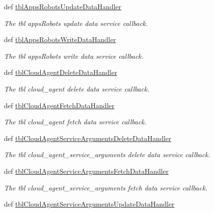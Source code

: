 \begin{DoxyCompactItemize}
def \hyperlink{classmysql__wrapper__old_1_1MySQLdbWrapper_a5158e06cd8ef056414394a8388f18d44}{tbl\-Apps\-Robots\-Update\-Data\-Handler}
\begin{DoxyCompactList}\small\item\em The tbl apps\-Robots update data service callback. \end{DoxyCompactList}\item 
def \hyperlink{classmysql__wrapper__old_1_1MySQLdbWrapper_ad88a32d718a11df3f800c5d8b904ca93}{tbl\-Apps\-Robots\-Write\-Data\-Handler}
\begin{DoxyCompactList}\small\item\em The tbl apps\-Robots write data service callback. \end{DoxyCompactList}\item 
def \hyperlink{classmysql__wrapper__old_1_1MySQLdbWrapper_a84e587fa673f32f88ea23d7c2b269799}{tbl\-Cloud\-Agent\-Delete\-Data\-Handler}
\begin{DoxyCompactList}\small\item\em The tbl cloud\-\_\-agent delete data service callback. \end{DoxyCompactList}\item 
def \hyperlink{classmysql__wrapper__old_1_1MySQLdbWrapper_afea4db33d2cda6796ad5704e1daec4ec}{tbl\-Cloud\-Agent\-Fetch\-Data\-Handler}
\begin{DoxyCompactList}\small\item\em The tbl cloud\-\_\-agent fetch data service callback. \end{DoxyCompactList}\item 
def \hyperlink{classmysql__wrapper__old_1_1MySQLdbWrapper_aa0129a1175e35d8777e5657655db241a}{tbl\-Cloud\-Agent\-Service\-Arguments\-Delete\-Data\-Handler}
\begin{DoxyCompactList}\small\item\em The tbl cloud\-\_\-agent\-\_\-service\-\_\-arguments delete data service callback. \end{DoxyCompactList}\item 
def \hyperlink{classmysql__wrapper__old_1_1MySQLdbWrapper_aac84f9b47386c8a8df5ce8626087f40d}{tbl\-Cloud\-Agent\-Service\-Arguments\-Fetch\-Data\-Handler}
\begin{DoxyCompactList}\small\item\em The tbl cloud\-\_\-agent\-\_\-service\-\_\-arguments fetch data service callback. \end{DoxyCompactList}\item 
def \hyperlink{classmysql__wrapper__old_1_1MySQLdbWrapper_a395dfbcd1af70bdedca5c0139d38d6ea}{tbl\-Cloud\-Agent\-Service\-Arguments\-Update\-Data\-Handler}

\end{DoxyCompactItemize}
